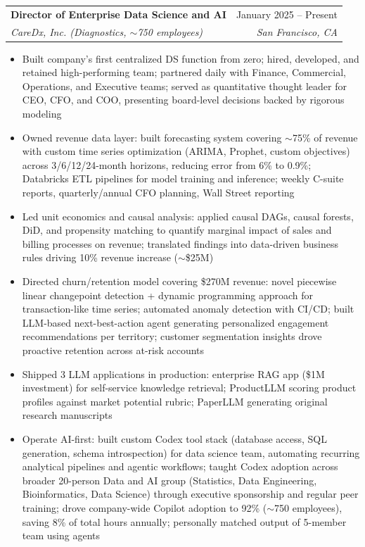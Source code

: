 \documentclass[letterpaper,11pt]{article}
\makeatletter
\newcommand{\resumeItem}[1]{
  \item\small{
    {#1 \vspace{-2pt}}
  }
}
\newcommand{\resumeSubheading}[4]{
  \vspace{-2pt}\item
    \begin{tabular*}{0.97\textwidth}[t]{l@{\extracolsep{\fill}}r}
      \textbf{#1} & #2 \\
      \textit{\small#3} & \textit{\small #4} \\
    \end{tabular*}\vspace{-7pt}
}
\newcommand{\resumeItemListStart}{\begin{itemize}}
\newcommand{\resumeItemListEnd}{\end{itemize}\vspace{-5pt}}
\makeatother
\begin{document}
    \resumeSubheading
      {Director of Enterprise Data Science and AI}{January 2025 -- Present}
      {CareDx, Inc. (Diagnostics, $\sim$750 employees)}{San Francisco, CA}
      \resumeItemListStart
        \resumeItem{Built company's first centralized DS function from zero; hired, developed, and retained high-performing team; partnered daily with Finance, Commercial, Operations, and Executive teams; served as quantitative thought leader for CEO, CFO, and COO, presenting board-level decisions backed by rigorous modeling}
        \resumeItem{Owned revenue data layer: built forecasting system covering $\sim$75\% of revenue with custom time series optimization (ARIMA, Prophet, custom objectives) across 3/6/12/24-month horizons, reducing error from 6\% to 0.9\%; Databricks ETL pipelines for model training and inference; weekly C-suite reports, quarterly/annual CFO planning, Wall Street reporting}
        \resumeItem{Led unit economics and causal analysis: applied causal DAGs, causal forests, DiD, and propensity matching to quantify marginal impact of sales and billing processes on revenue; translated findings into data-driven business rules driving 10\% revenue increase ($\sim$\$25M)}
        \resumeItem{Directed churn/retention model covering \$270M revenue: novel piecewise linear changepoint detection + dynamic programming approach for transaction-like time series; automated anomaly detection with CI/CD; built LLM-based next-best-action agent generating personalized engagement recommendations per territory; customer segmentation insights drove proactive retention across at-risk accounts}
        \resumeItem{Shipped 3 LLM applications in production: enterprise RAG app (\$1M investment) for self-service knowledge retrieval; ProductLLM scoring product profiles against market potential rubric; PaperLLM generating original research manuscripts}
        \resumeItem{Operate AI-first: built custom Codex tool stack (database access, SQL generation, schema introspection) for data science team, automating recurring analytical pipelines and agentic workflows; taught Codex adoption across broader 20-person Data and AI group (Statistics, Data Engineering, Bioinformatics, Data Science) through executive sponsorship and regular peer training; drove company-wide Copilot adoption to 92\% ($\sim$750 employees), saving 8\% of total hours annually; personally matched output of 5-member team using agents}
      \resumeItemListEnd
\end{document}
